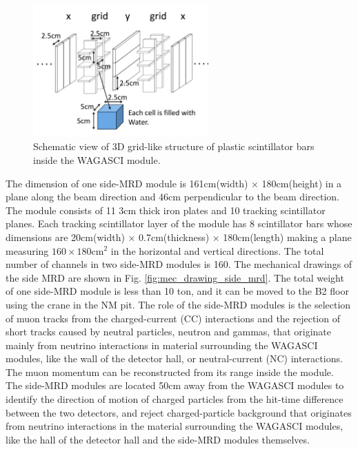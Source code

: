 \begin{figure}%
  \begin{center}
  \includegraphics[width=0.6\textwidth]{figs/3d_grid_structure.pdf}
  \caption{Schematic view of 3D grid-like structure of plastic scintillator bars inside the WAGASCI module.}
  \label{fig:3d_grid_structure}
  \end{center}
\end{figure}



The dimension of one side-MRD module is 161cm(width) $\times$ 180cm(height) 
in a plane along the beam direction and 46cm perpendicular to the beam direction.
The module consists of 11 3cm thick iron plates and 10 tracking scintillator planes.
Each tracking scintillator layer of the module has 8 scintillator bars whose dimensions are
20cm(width) $\times$ 0.7cm(thickness) $\times$ 180cm(length) making a plane measuring $160\times180$cm$^{2}$
in the horizontal and vertical directions.
The total number of channels in two side-MRD modules is 160.
The mechanical drawings of the side MRD are shown in Fig. \ref{fig:mec_drawing_side_mrd}.
The total weight of one side-MRD module is less than 10 ton, and it can be moved to the B2 floor using the crane in the NM pit.
The role of the side-MRD modules is the selection of muon tracks from the charged-current (CC) interactions and the rejection of short tracks caused by neutral particles, neutron and gammas,
that originate mainly from neutrino interactions in material surrounding the WAGASCI modules,
like the wall of the detector hall, or neutral-current (NC) interactions.
The muon momentum can be reconstructed from its range inside the module.
The side-MRD modules are located 50cm away from the WAGASCI modules to identify the 
direction of motion of charged particles from the hit-time difference between the two detectors,
and reject charged-particle background that originates from neutrino interactions
in the material surrounding the WAGASCI modules, like the hall of the detector hall and the side-MRD modules themselves.

